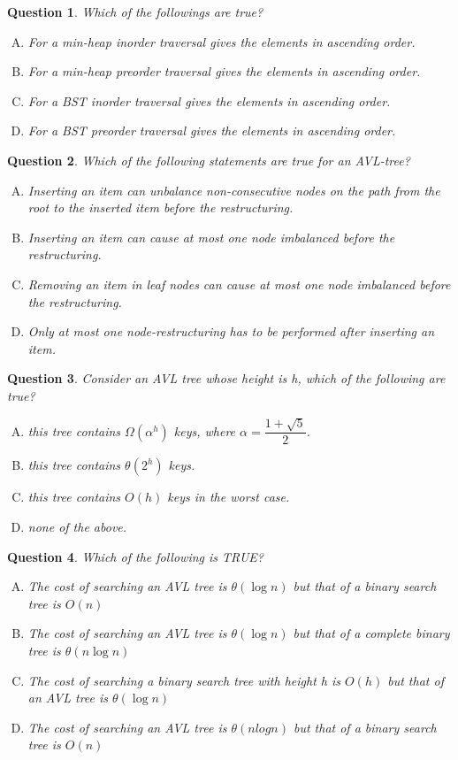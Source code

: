 \documentclass{article}
\newtheorem{Q}{Question}
\begin{document}
\begin{Q}
	Which of the followings are true? 
	\begin{enumerate}[(A)]
		\item For a min-heap inorder traversal gives the elements in ascending order.
		\item For a min-heap preorder traversal gives the elements in ascending order.
		\item For a BST inorder traversal gives the elements in ascending order.
		\item For a BST preorder traversal gives the elements in ascending order.
	\end{enumerate}
\end{Q}


\begin{Q}
	Which of the following statements are true for an AVL-tree?
	\begin{enumerate}[(A)]
		\item Inserting an item can unbalance non-consecutive nodes on the path from the root to the inserted item before the restructuring.
		\item Inserting an item can cause at most one node imbalanced before the restructuring.
		\item Removing an item in leaf nodes can cause at most one node imbalanced before the restructuring.
		\item Only at most one node-restructuring has to be performed after inserting an item.
	\end{enumerate}
\end{Q}



\begin{Q}
	Consider an AVL tree whose height is h, which of the following are true?
	\begin{enumerate}[(A)]
		\item this tree contains $\Omega(\alpha^h)$ keys, where $\alpha = \dfrac{1+\sqrt{5}}{2}$.
		\item this tree contains $\theta(2^h)$ keys.
		\item this tree contains $O(h)$ keys in the worst case.
		\item none of the above.
	\end{enumerate}
\end{Q}
\begin{Q}
Which of the following is TRUE?
\begin{enumerate}[(A)]
\item The cost of searching an AVL tree is $\theta(\log n)$ but that of a binary search tree is $O(n)$
\item The cost of searching an AVL tree is $\theta(\log n)$ but that of a complete binary tree is $\theta(n \log n)$
\item The cost of searching a binary search tree with height h is $O(h)$ but that of an AVL tree is $\theta(\log n)$
\item The cost of searching an AVL tree is $\theta(n log n)$ but that of a binary search tree is $O(n)$
\end{enumerate}
\end{Q}
\end{document}
